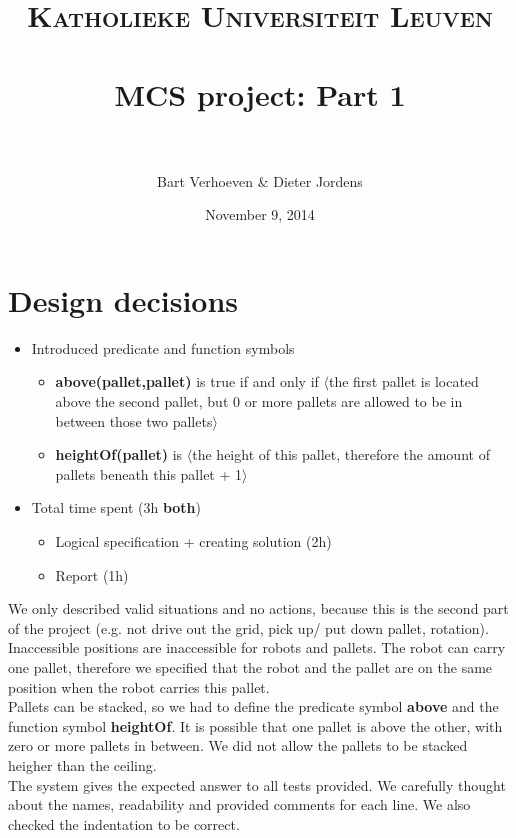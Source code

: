 \documentclass[paper=a4, fontsize=11pt]{scrartcl} %
\title{	
\normalfont \normalsize 
\textsc{Katholieke Universiteit Leuven} \\ [25pt] %
\horrule{0.5pt} \\[0.4cm] %
\huge MCS project: Part 1 \\ %
\horrule{2pt} \\[0.5cm] %
}
\author{Bart Verhoeven \& Dieter Jordens} %
\date{\normalsize November 9, 2014} %
\numberwithin{equation}{section} %
\numberwithin{figure}{section} %
\numberwithin{table}{section} %
\begin{document}
\maketitle %


\section{Design decisions}


\begin{itemize}
	\item Introduced predicate and function symbols
		\begin{itemize}
		\item \textbf{above(pallet,pallet)} is true if and only if $\langle$the first pallet is located above the second pallet, but 0 or more pallets are allowed to be in between those two pallets$\rangle$
		\item \textbf{heightOf(pallet)} is $\langle$the height of this pallet, therefore the amount of pallets beneath this pallet + 1$\rangle$
		\end{itemize}
     \item Total time spent (3h \textbf{both})
     \begin{itemize}
     	\item Logical specification + creating solution (2h)
        \item Report (1h)
     \end{itemize}
\end{itemize}
We only described valid situations and no actions, because this is the second part of the project (e.g. not drive out the grid, pick up/ put down pallet, rotation).\\
Inaccessible positions are inaccessible for robots and pallets. 
The robot can carry one pallet, therefore we specified that the robot and the pallet are on the same position when the robot carries this pallet.\\
Pallets can be stacked, so we had to define the predicate symbol \textbf{above} and the function symbol \textbf{heightOf}. It is possible that one pallet is above the other, with zero or more pallets in between. We did not allow the pallets to be stacked heigher than the ceiling.\\
The system gives the expected answer to all tests provided. We carefully thought about the names, readability and provided comments for each line. We also checked the indentation to be correct. 
\end{document}
